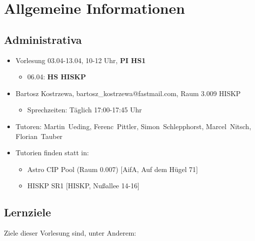 \setcounter{minutecounter}{0}

\section*{Allgemeine Informationen}

\subsection{Administrativa}

\iflecturer
\begin{framed}

  \slide{}
\end{framed}
\fi %

\begin{itemize}
 \item{Vorlesung 03.04-13.04, 10-12 Uhr, \textbf{PI HS1}}
 \begin{itemize}
   \item{06.04: \textbf{HS HISKP} }
 \end{itemize}
 \item{Bartosz Kostrzewa, bartosz\_kostrzewa@fastmail.com, Raum 3.009 HISKP}
 \begin{itemize}
   \item{Sprechzeiten: Täglich 17:00-17:45 Uhr}
 \end{itemize}
 \item{Tutoren: Martin~Ueding, Ferenc~Pittler, Simon~Schlepphorst, Marcel~Nitsch, Florian~Tauber}
 \item{Tutorien finden statt in:}
 \begin{itemize}
   \item{Astro CIP Pool (Raum 0.007) [AifA, Auf dem Hügel 71]}
   \item{HISKP SR1 [HISKP, Nußallee 14-16]}
 \end{itemize}
\end{itemize}

\subsection{Lernziele}

\iflecturer
\begin{framed}

  \slide{}
\end{framed}
\fi %

Ziele dieser Vorlesung sind, unter Anderem:

